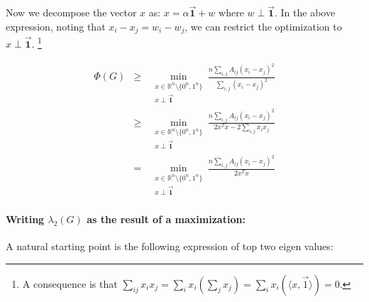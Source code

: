 Now we decompose the vector $x$ as: $x = \alpha\overrightarrow{\mathbf 1}+w$ where $w \perp \overrightarrow{\mathbf 1}$. In the above expression, noting that $x_i-x_j = w_i-w_j$, we can restrict the optimization to $x \perp \overrightarrow{\mathbf 1}$. \footnote{A consequence is that $\sum_{ij} x_ix_j = \sum_i x_i (\sum_j x_j) = \sum_i x_i (\langle x, \overrightarrow{1} \rangle) = 0$.} 

\begin{eqnarray}
\Phi(G) & \ge & \min_{\substack{
x \in \mathbb{R}^n\setminus \{0^n,1^n\}\\
x \perp \mathbf{\overrightarrow{1}}}}
\frac{n\sum_{i,j}A_{ij}(x_i-x_j)^2}{\sum_{i,j}(x_i-x_j)^2}\\
& \ge & \min_{\substack{
x \in \mathbb{R}^n\setminus \{0^n,1^n\}\\
x \perp \mathbf{\overrightarrow{1}}}}
\frac{n\sum_{i,j}A_{ij}(x_i-x_j)^2}{2x^Tx-2\sum_{i,j} x_ix_j} \\
& = & \min_{\substack{
x \in \mathbb{R}^n\setminus \{0^n,1^n\}\\
x \perp \mathbf{\overrightarrow{1}}}}
\frac{n\sum_{i,j}A_{ij}(x_i-x_j)^2}{2x^Tx}
\label{eqn:cheeger-optimization}
\end{eqnarray}

\paragraph{\textbf{Writing $\lambda_2(G)$ as the result of a maximization:}} A natural starting point is the following expression of top two eigen values:

